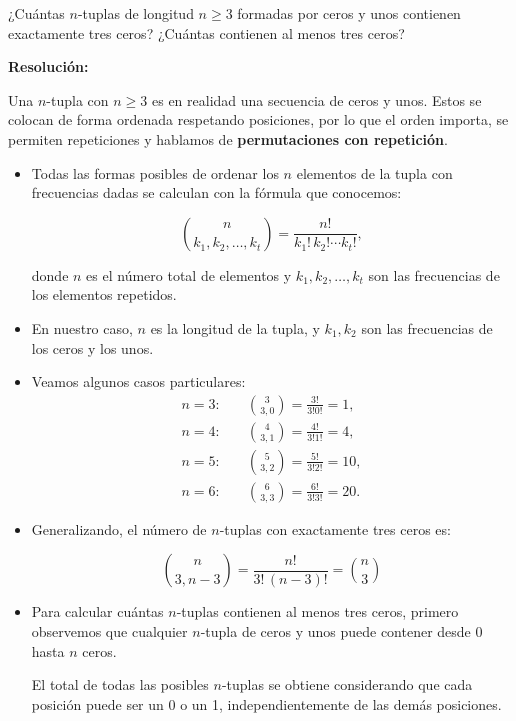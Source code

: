 \documentclass[a4paper,12pt]{article}
\begin{document}
\begin{ejercicio}[title=Ejercicio 16]
¿Cuántas $n$-tuplas de longitud $n \ge 3$ formadas por ceros y unos contienen exactamente tres ceros? ¿Cuántas contienen al menos tres ceros?

\tcblower
\textbf{Resolución:}

Una $n$-tupla con $n \ge 3$ es en realidad una secuencia de ceros y unos. Estos se colocan de forma ordenada respetando posiciones, por lo que el orden importa, se permiten repeticiones y hablamos de \textbf{permutaciones con repetición}.

\begin{itemize}
\item Todas las formas posibles de ordenar los $n$ elementos de la tupla con frecuencias dadas se calculan con la fórmula que conocemos:

\[
\binom{n}{k_1,k_2,\dots,k_t} = \frac{n!}{k_1!\, k_2! \cdots k_t!},
\]

donde $n$ es el número total de elementos y $k_1,k_2,\dots,k_t$ son las frecuencias de los elementos repetidos.  

\item En nuestro caso, $n$ es la longitud de la tupla, y $k_1,k_2$ son las frecuencias de los ceros y los unos.

\item Veamos algunos casos particulares:
\[
\begin{aligned}
n = 3: &\quad \binom{3}{3,0} = \frac{3!}{3!0!} = 1,\\
n = 4: &\quad \binom{4}{3,1} = \frac{4!}{3!1!} = 4,\\
n = 5: &\quad \binom{5}{3,2} = \frac{5!}{3!2!} = 10,\\
n = 6: &\quad \binom{6}{3,3} = \frac{6!}{3!3!} = 20.
\end{aligned}
\]

\item Generalizando, el número de $n$-tuplas con exactamente tres ceros es:

\[
\binom{n}{3,n-3} = \frac{n!}{3!\, (n-3)!} = \boxed{\binom{n}{3}}
\]

\item Para calcular cuántas $n$-tuplas contienen al menos tres ceros, primero observemos que cualquier $n$-tupla de ceros y unos puede contener desde 0 hasta $n$ ceros.  

El total de todas las posibles $n$-tuplas se obtiene considerando que cada posición puede ser un 0 o un 1, independientemente de las demás posiciones.

\end{itemize}
\end{ejercicio}
\end{document}
